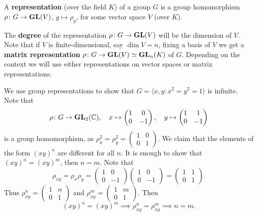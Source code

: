 \chapter{}


\begin{definition}
	A \textbf{representation} (over the field $K$) of a group $G$ is a group homomorphism
	$\rho\colon G\to\mathbf{GL}(V)$, $g\mapsto\rho_g$, for some vector space $V$ (over $K$).
\end{definition}

The \textbf{degree} of the representation $\rho\colon G\to\mathbf{GL}(V)$ will be the dimension of $V$. Note that
if $V$ is finite-dimensional, say $\dim V=n$, fixing a basis of $V$ we get a \textbf{matrix representation} 
$\rho\colon G\to\mathbf{GL}(V)\simeq\mathbf{GL}_n(K)$ of $G$. Depending on the context we will use either
representations on vector spaces or matrix representations.  

\begin{example}
	We use group representations to show that 
	$G=\langle x,y:x^2=y^2=1\rangle$ is infinite. Note that
	\[
	\rho\colon G\to\mathbf{GL}_2(\mathbb{C}),
	\quad
	x\mapsto\begin{pmatrix}
		1&0\\
		0&-1	
	\end{pmatrix},\quad
 	y\mapsto\begin{pmatrix}
		1&1\\
		0&-1	
	\end{pmatrix}
 	\]
 	is a group homomorphism, as 
 	$\rho_x^2=\rho_y^2=\begin{pmatrix}
		1&0\\
		0&1	
	\end{pmatrix}$. We claim that the elements of the form $(xy)^n$ are
	different for all $n$. It is enough to show that   
	$(xy)^n=(xy)^m$, then $n=m$. Note that
	\[
	\rho_{xy}=\rho_x\rho_y=\begin{pmatrix}
		1&0\\
		0&-1	
	\end{pmatrix}
	\begin{pmatrix}
		1&0\\
		0&-1	
	\end{pmatrix}
	=\begin{pmatrix}
		1&1\\
		0&1	
	\end{pmatrix}.
	\]
	Thus $\rho_{xy}^n=\begin{pmatrix}
		1&n\\
		0&1	
	\end{pmatrix}$ and 
	$\rho_{xy}^m=\begin{pmatrix}
		1&m\\
		0&1	
	\end{pmatrix}$. Then 
	\[
	(xy)^n=(xy)^m\implies\rho_{xy}^n=\rho_{xy}^m\implies n=m.
	\] 
\end{example}

